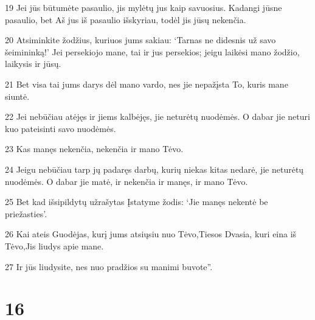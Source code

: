 \par 19 Jei jūs būtumėte pasaulio, jis mylėtų jus kaip savuosius. Kadangi jūs­ne pasaulio, bet Aš jus iš pasaulio išskyriau, todėl jis jūsų nekenčia. 
\par 20 Atsiminkite žodžius, kuriuos jums sakiau: ‘Tarnas ne didesnis už savo šeimininką!’ Jei persekiojo mane, tai ir jus persekios; jeigu laikėsi mano žodžio, laikysis ir jūsų. 
\par 21 Bet visa tai jums darys dėl mano vardo, nes jie nepažįsta To, kuris mane siuntė. 
\par 22 Jei nebūčiau atėjęs ir jiems kalbėjęs, jie neturėtų nuodėmės. O dabar jie neturi kuo pateisinti savo nuodėmės. 
\par 23 Kas manęs nekenčia, nekenčia ir mano Tėvo. 
\par 24 Jeigu nebūčiau tarp jų padaręs darbų, kurių niekas kitas nedarė, jie neturėtų nuodėmės. O dabar jie matė, ir nekenčia ir manęs, ir mano Tėvo. 
\par 25 Bet kad išsipildytų užrašytas Įstatyme žodis: ‘Jie manęs nekentė be priežasties’. 
\par 26 Kai ateis Guodėjas, kurį jums atsiųsiu nuo Tėvo,­Tiesos Dvasia, kuri eina iš Tėvo,­Jis liudys apie mane. 
\par 27 Ir jūs liudysite, nes nuo pradžios su manimi buvote”.


\chapter{16}


